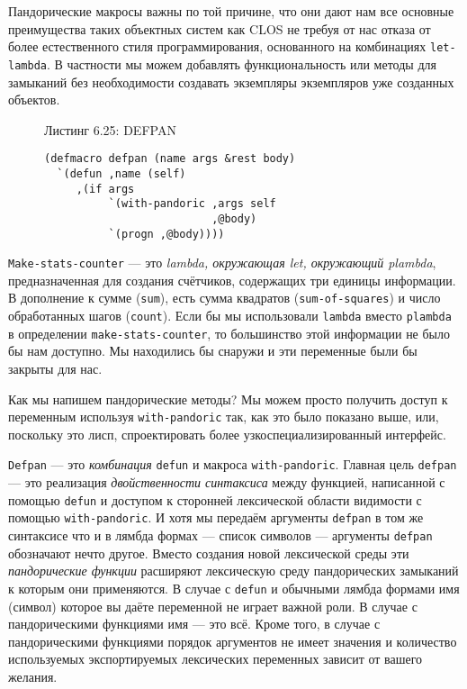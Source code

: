 Пандорические макросы важны по той причине, что они дают нам все основные преимущества таких объектных систем как CLOS не требуя от нас отказа от более естественного стиля программирования, основанного на комбинациях \verb"let-lambda". В частности мы можем добавлять функциональность или методы для замыканий без необходимости создавать экземпляры экземпляров уже созданных объектов.

\begin{figure}Листинг 6.25: DEFPAN\label{listing_6.25}
\listbegin
\begin{verbatim}
(defmacro defpan (name args &rest body)
  `(defun ,name (self)
     ,(if args
          `(with-pandoric ,args self
                          ,@body)
          `(progn ,@body))))
\end{verbatim}
\listend
\end{figure}

\verb"Make-stats-counter" --- это \emph{lambda, окружающая let, окружающий {p\-lamb\-da}}, предназначенная для создания счётчиков, содержащих три единицы информации. В дополнение к сумме (\verb"sum"), есть сумма квадратов (\verb"sum-of-squares") и число обработанных шагов (\verb"count"). Если бы мы использовали \verb"lambda" вместо \verb"plambda" в определении \verb"make-stats-counter", то большинство этой информации не было бы нам доступно. Мы находились бы снаружи и эти переменные были бы закрыты для нас.

Как мы напишем пандорические методы? Мы можем просто получить доступ к переменным используя \verb"with-pandoric" так, как это было показано выше, или, поскольку это лисп, спроектировать более узкоспециализированный интерфейс.

\verb"Defpan" --- это \emph{комбинация} \verb"defun" и макроса \verb"with-pandoric". Главная цель \verb"defpan" --- это реализация \emph{двойственности синтаксиса} между функцией, написанной с помощью \verb"defun" и доступом к сторонней лексической области видимости с помощью \verb"with-pandoric". И хотя мы передаём аргументы \verb"defpan" в том же синтаксисе что и в лямбда формах --- список символов --- аргументы \verb"defpan" обозначают нечто другое. Вместо создания новой лексической среды эти \emph{пандорические функции} расширяют лексическую среду пандорических замыканий к которым они применяются. В случае с \verb"defun" и обычными лямбда формами имя (символ) которое вы даёте переменной не играет важной роли. В случае с пандорическими функциями имя --- это всё. Кроме того, в случае с пандорическими функциями порядок аргументов не имеет значения и количество используемых экспортируемых лексических переменных зависит от вашего желания.

